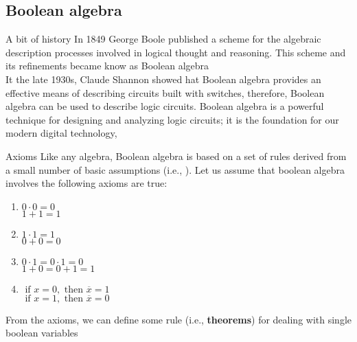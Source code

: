 \subsection{Boolean algebra}
\begin{parag}{A bit of history}
    In 1849 George Boole published a scheme for the algebraic description processes involved in logical thought and reasoning. This scheme and its refinements became know as Boolean algebra \\
    It the late 1930s, Claude Shannon showed hat Boolean algebra provides an effective means of describing circuits built with switches, therefore, Boolean algebra can be used to describe logic circuits. Boolean algebra is a powerful technique for designing and analyzing logic circuits; it is the foundation for our modern digital technology,

\end{parag}
\begin{parag}{Axioms}
    Like any algebra, Boolean algebra is based on a set of rules derived from a small number of basic assumptions (i.e., ). Let us assume that boolean algebra involves the following axioms are true:
    \begin{enumerate}
    \item 
        $0 \cdot 0 = 0 $\\
        $1 + 1 = 1$
\item 
   $ 1 \cdot 1 = 1$ \\
   $ 0 + 0 = 0$
\item 
    $0 \cdot 1 = 0 \cdot 1 = 0 $\\
$    1 + 0 = 0 + 1 = 1$
\item 
$        \text{ if } x = 0, \text{ then } \overline{x} = 1 $\\
 $       \text{ if } x = 1, \text{ then } \overline{x} = 0$
    \end{enumerate}
    
    From the axioms, we can define some rule (i.e., \textbf{theorems}) for dealing with single boolean variables

\end{parag}

